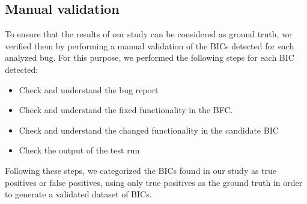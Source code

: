 
\subsection{Manual validation}
\label{subsec:manual}

To ensure that the results of our study can be considered as ground truth, we verified them by performing a manual validation of the BICs detected for each analyzed bug. For this purpose, we performed the following steps for each BIC detected:

\begin{itemize}
    \item Check and understand the bug report
    \item Check and understand the fixed functionality in the BFC.
    \item Check and understand the changed functionality in the candidate BIC
    \item Check the output of the test run
\end{itemize}

Following these steps, we categorized the BICs found in our study as true positives or false positives, using only true positives as the ground truth in order to generate a validated dataset of BICs.

